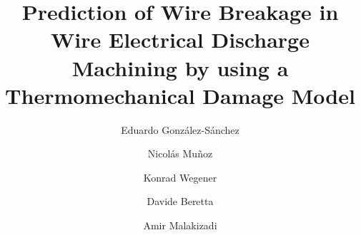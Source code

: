 \documentclass[5p,times,procedia]{elsarticle}
\begin{document}
\begin{frontmatter}



%

\title{Prediction of Wire Breakage in Wire Electrical Discharge Machining by using a Thermomechanical Damage Model}



\author[a,b]{Eduardo González-Sánchez}
\author[a,c]{Nicolás Muñoz} 
\author[a]{Konrad Wegener}
\author[a]{Davide Beretta}
\author[a]{Amir Malakizadi}


\address[a]{inspire AG, Technoparkstrasse 1, Zurich, 8005, Switzerland}
\address[b]{Chair of Artificial Intelligence in Mechanics and Manufacturing, ETH Zurich, Rämistrasse 101, Zurich, 8092, Switzerland}
\address[c]{Tecnun School of Engineering, Universidad de Navarra, Manuel Lardizabal 13, San Sebastián, 20018,  Spain}




\end{frontmatter}
\end{document}
